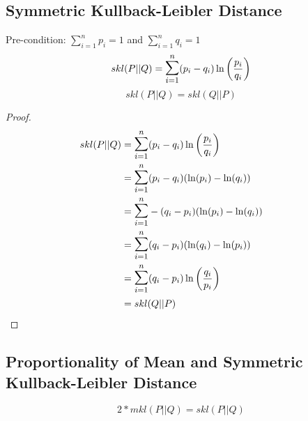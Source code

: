 \documentclass[10pt,a4paper]{article}
\begin{document}
\subsection{Symmetric Kullback-Leibler Distance}
Pre-condition: $\sum\limits_{i=1}^n p_i = 1$ and $\sum\limits_{i=1}^n q_i = 1$
\begin{equation}
  skl(P||Q) = \mathlarger{\mathlarger{\sum}}\limits_{i=1}^n (p_i-q_i) \ln \left(\frac{p_i}{q_i}\right)
  \label{eq:s_kbl}
\end{equation}
\begin{equation}
  skl(P||Q) = skl(Q||P)
\end{equation}
\begin{proof}
\begin{align*}
  skl(P||Q) &= \mathlarger{\mathlarger{\sum}}\limits_{i=1}^n (p_i-q_i) \ln \left(\frac{p_i}{q_i}\right) \\
            &= \mathlarger{\mathlarger{\sum}}\limits_{i=1}^n (p_i-q_i) ( \ln(p_i) - \ln(q_i) ) \\
            &= \mathlarger{\mathlarger{\sum}}\limits_{i=1}^n -(q_i-p_i) ( \ln(p_i) - \ln(q_i) ) \\
            &= \mathlarger{\mathlarger{\sum}}\limits_{i=1}^n (q_i-p_i) ( \ln(q_i) - \ln(p_i) ) \\
            &= \mathlarger{\mathlarger{\sum}}\limits_{i=1}^n (q_i - p_i) \ln \left(\frac{q_i}{p_i}\right) \\
            &= skl(Q||P) && \qedhere
\end{align*}
\end{proof}

\subsection{Proportionality of Mean and Symmetric Kullback-Leibler Distance}
\begin{equation}
	2*mkl(P||Q) = skl(P||Q)
	\label{eq:2_times_mkl_equals_skl}
\end{equation}
\end{document}
